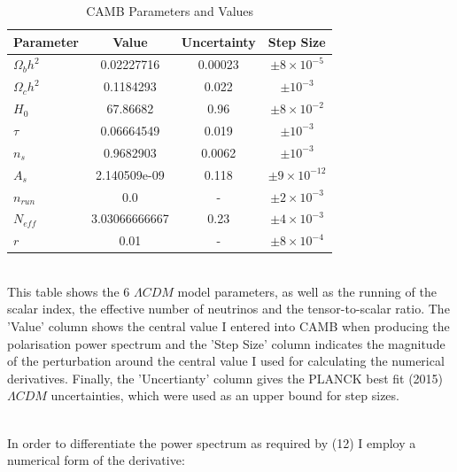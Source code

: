 \begin{table}[h]
\centering
\caption{CAMB Parameters and Values}
\label{my-label}
\begin{tabular}{l|l|l|l}
Parameter & \multicolumn{1}{c|}{Value} & Uncertainty & Step Size \\ \hline
$\Omega_{b}h^{2}$ & \multicolumn{1}{c|}{0.02227716} & \multicolumn{1}{c|}{0.00023} & \multicolumn{1}{c}{$\pm 8 \times 10^{-5}$} \\
$\Omega_{c}h^{2}$ & \multicolumn{1}{c|}{0.1184293} & \multicolumn{1}{c|}{0.022} & \multicolumn{1}{c}{$\pm 10^{-3}$} \\
$H_0$ & \multicolumn{1}{c|}{67.86682} & \multicolumn{1}{c|}{0.96} & \multicolumn{1}{c}{$\pm 8 \times 10^{-2}$} \\
$\tau$ & \multicolumn{1}{c|}{0.06664549} & \multicolumn{1}{c|}{0.019} & \multicolumn{1}{c}{$\pm 10^{-3}$} \\
$n_s$ & \multicolumn{1}{c|}{0.9682903} & \multicolumn{1}{c|}{0.0062} & \multicolumn{1}{c}{$\pm 10^{-3}$} \\
$A_s$ & \multicolumn{1}{c|}{2.140509e-09} & \multicolumn{1}{c|}{0.118} & \multicolumn{1}{c}{$\pm 9 \times 10^{-12}$} \\
$n_{run}$ & \multicolumn{1}{c|}{0.0} & \multicolumn{1}{c|}{-} & \multicolumn{1}{c}{$\pm 2 \times 10^{-3}$} \\
$N_{eff}$ & \multicolumn{1}{c|}{3.03066666667} & \multicolumn{1}{c|}{0.23} & \multicolumn{1}{c}{$\pm 4 \times 10^{-3}$} \\
$r$ & \multicolumn{1}{c|}{0.01} & \multicolumn{1}{c|}{-} & \multicolumn{1}{c}{$\pm 8 \times 10^{-4}$} \\
\end{tabular}
\bigskip
\\This table shows the 6 $\Lambda CDM$ model parameters, as well as the running of the scalar index, the effective number of neutrinos and the tensor-to-scalar ratio. The 'Value' column shows the central value I entered into CAMB when producing the polarisation power spectrum and the 'Step Size' column indicates the magnitude of the perturbation around the central value I used for calculating the numerical derivatives. Finally, the 'Uncertianty' column gives the PLANCK best fit (2015) \cite{Ade:2015xua} $\Lambda CDM$ uncertainties, which were used as an upper bound for step sizes.
\end{table}
\\

In order to differentiate the power spectrum as required by (12) I employ a numerical form of the derivative:


